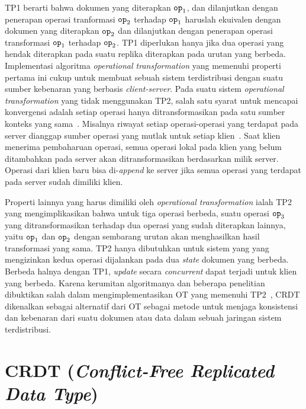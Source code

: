 TP1 berarti bahwa dokumen yang diterapkan $\texttt{op}_1$, dan dilanjutkan dengan penerapan operasi tranformasi $\texttt{op}_2$ terhadap $\texttt{op}_1$ haruslah ekuivalen dengan dokumen yang diterapkan $\texttt{op}_2$ dan dilanjutkan dengan penerapan operasi transformasi $\texttt{op}_1$ terhadap $\texttt{op}_2$. TP1 diperlukan hanya jika dua operasi yang hendak diterapkan pada suatu replika diterapkan pada urutan yang berbeda. Implementasi algoritma \textit{operational transformation} yang memenuhi properti pertama ini cukup untuk membuat sebuah sistem terdistribusi dengan suatu sumber kebenaran yang berbasis \textit{client-server}. Pada suatu sistem \textit{operational transformation} yang tidak menggunakan TP2, salah satu syarat untuk mencapai konvergensi adalah setiap operasi hanya ditransformasikan pada satu sumber konteks yang sama~\citep{Xu2016}. Misalnya riwayat setiap operasi-operasi yang terdapat pada server dianggap sumber operasi yang mutlak untuk setiap klien~\citep{Vidot2000}. Saat klien menerima pembaharuan operasi, semua operasi lokal pada klien yang belum ditambahkan pada server akan ditransformasikan berdasarkan milik server. Operasi dari klien baru bisa di-\textit{append} ke server jika semua operasi yang terdapat pada server sudah dimiliki klien.

Properti lainnya yang harus dimiliki oleh \textit{operational transformation} ialah TP2 yang mengimplikasikan bahwa untuk tiga operasi berbeda, suatu operasi $\texttt{op}_3$ yang ditransformasikan terhadap dua operasi yang sudah diterapkan lainnya, yaitu $\texttt{op}_1$ dan $\texttt{op}_2$ dengan sembarang urutan akan menghasilkan hasil transformasi yang sama. TP2 hanya dibutuhkan untuk sistem yang yang mengizinkan kedua operasi dijalankan pada dua \textit{state} dokumen yang berbeda. Berbeda halnya dengan TP1, \textit{update} secara \textit{concurrent} dapat terjadi untuk klien yang berbeda. Karena kerumitan algoritmanya dan beberapa penelitian dibuktikan salah dalam mengimplementasikan OT yang memenuhi TP2~\citep{OTOverview1}, CRDT dikenalkan sebagai alternatif dari OT sebagai metode untuk menjaga konsistensi dan kebenaran dari suatu dokumen atau data dalam sebuah jaringan sistem terdistribusi.

\section{CRDT (\textit{Conflict-Free Replicated Data Type})}

